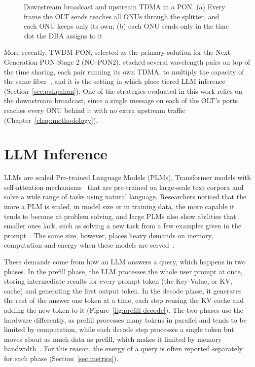 \documentclass[cic,dipl,english]{infufrgs}
\begin{document}
\begin{figure}[htb]
  \centering
  \caption[Downstream broadcast and upstream TDMA in a PON]{Downstream broadcast and upstream TDMA in a PON.
  (a) Every frame the OLT sends reaches all ONUs through the splitter, and each ONU keeps only its own; (b) each ONU sends only in the time slot the DBA assigns to it}
  \label{fig:pon}
  \vspace{6pt}
  
\end{figure}

More recently, TWDM-PON, selected as the primary solution for the Next-Generation PON Stage 2 (NG-PON2), stacked several wavelength pairs on
top of the time sharing, each pair running its own TDMA, to multiply the capacity of the
same fiber~\cite{luo2013twdm}, and it is the setting in which
 place tiered LLM inference
(Section~\ref{sec:pakpahan}). One of the strategies evaluated in this work relies on
the downstream broadcast, since a single message on each of the OLT's ports reaches every
ONU behind it with no extra upstream traffic (Chapter~\ref{chap:methodology}).

\section{LLM Inference}
\label{sec:llm-background}

LLMs are scaled Pre-trained Language Models (PLMs), Transformer models with
self-attention mechanisms~\cite{vaswani2017attention} that are pre-trained on large-scale
text corpora and solve a wide range of tasks using natural language. Researchers noticed
that the more a PLM is scaled, in model size or in training data, the more capable it
tends to become at problem solving, and large PLMs also show abilities that smaller ones
lack, such as solving a new task from a few examples given in the
prompt~\cite{zhao2023survey}. The same size, however, places heavy demands on memory,
computation and energy when these models are served~\cite{chen2026network}.

These demands come from how an LLM answers a query, which happens in two
phases. In the prefill phase, the LLM processes the whole user prompt at once, storing
intermediate results for every prompt token (the Key-Value, or KV, cache) and generating
the first output token. In the decode phase, it generates the rest of the answer one
token at a time, each step reusing the KV cache and adding the new token to it
(Figure~\ref{fig:prefill-decode}). The two phases use the hardware differently, as prefill processes many tokens in
parallel and tends to be limited by computation, while each decode step processes a single token
but moves about as much data as prefill, which makes it limited by memory
bandwidth~\cite{zhong2024distserve}. For this reason, the energy of a query is often
reported separately for each phase (Section~\ref{sec:metrics}).
\end{document}
